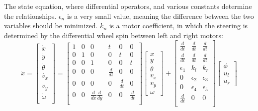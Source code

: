 \noindent The state equation, where differential operators, and various constants determine the relationships. $\epsilon_n$ is a very small value, meaning the difference between the two variables should be minimized. $k_n$ is a motor coefficient, in which the steering is determined by the differential wheel spin between left and right motors:
\[\dot{x} =
\begin{bmatrix}
	\dot{x}\\ \dot{y}\\ \dot{\theta}\\ \dot{v_x}\\ \dot{v_y}\\ \dot{\omega}\\
\end{bmatrix} = 
\begin{bmatrix}
	1 & 0 & 0 & t & 0 & 0 \\
	0 & 1 & 0 & 0 & t & 0 \\
	0 & 0 & 1 & 0 & 0 & t \\
	0 & 0 & 0 & \frac{d}{dt} & 0 & 0 \\
	0 & 0 & 0 & 0 & \frac{d}{dt} & 0 \\
	0 & 0 & \frac{d}{dx}\frac{d}{dy} & 0 & 0 & \frac{d}{dt} \\
\end{bmatrix}
\begin{bmatrix}
	x\\ y\\ \theta\\ v_x\\ v_y\\ \omega
\end{bmatrix} + 
\begin{bmatrix}
	\frac{d}{dt} & \frac{d}{dt} & \frac{d}{dt} \\
	\frac{d}{dt} & \frac{d}{dt} & \frac{d}{dt} \\
	\epsilon_1 & k_l & k_r \\
	0 & \epsilon_2 & \epsilon_3 \\
	0 & \epsilon_4 & \epsilon_5 \\
	\frac{d}{dt} & 0 & 0\\
\end{bmatrix}
\begin{bmatrix}
	\phi\\ u_l\\ u_r
\end{bmatrix}
\]

